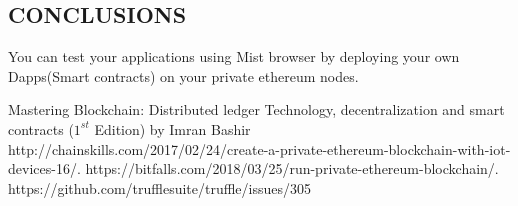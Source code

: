 \documentclass[journal,12pt,twocolumn]{IEEEtran}
\begin{document}
\subsection{CONCLUSIONS}
You can test your applications using Mist browser by deploying your own Dapps(Smart contracts) on your private ethereum nodes. 

\begin{thebibliography}{99}
 Mastering Blockchain: Distributed ledger Technology, decentralization and smart contracts ($1^{st}$ Edition) by Imran Bashir 
 http://chainskills.com/2017/02/24/create-a-private-ethereum-blockchain-with-iot-devices-16/.
 https://bitfalls.com/2018/03/25/run-private-ethereum-blockchain/.
 https://github.com/trufflesuite/truffle/issues/305

\end{thebibliography}
\end{document}
